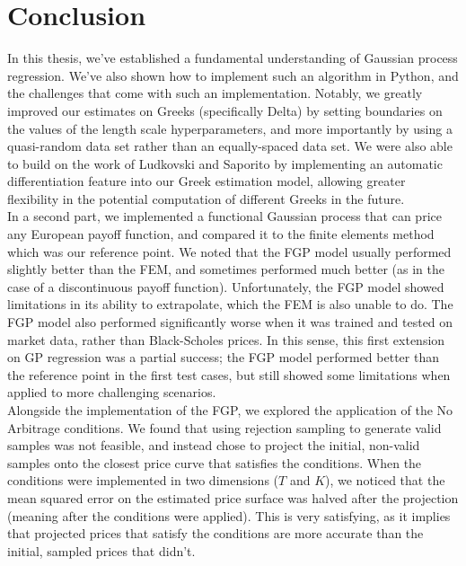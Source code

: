 \documentclass[a4paper,12pt]{article}
\begin{document}
\newpage
\section{Conclusion}
In this thesis, we've established a fundamental understanding of Gaussian process regression. We've also shown how to implement such an algorithm in Python, and the challenges that come with such an implementation. Notably, we greatly improved our estimates on Greeks (specifically Delta) by setting boundaries on the values of the length scale hyperparameters, and more importantly by using a quasi-random data set rather than an equally-spaced data set. We were also able to build on the work of Ludkovski and Saporito \cite{Ludkovski2020} by implementing an automatic differentiation feature into our Greek estimation model, allowing greater flexibility in the potential computation of different Greeks in the future.\\
In a second part, we implemented a functional Gaussian process that can price any European payoff function, and compared it to the finite elements method which was our reference point. We noted that the FGP model usually performed slightly better than the FEM, and sometimes performed much better (as in the case of a discontinuous payoff function). Unfortunately, the FGP model showed limitations in its ability to extrapolate, which the FEM is also unable to do. The FGP model also performed significantly worse when it was trained and tested on market data, rather than Black-Scholes prices.  In this sense, this first extension on GP regression was a partial success; the FGP model performed better than the reference point in the first test cases, but still showed some limitations when applied to more challenging scenarios.\\
Alongside the implementation of the FGP, we explored the application of the No Arbitrage conditions. We found that using rejection sampling to generate valid samples was not feasible, and instead chose to project the initial, non-valid samples onto the closest price curve that satisfies the conditions. When the conditions were implemented in two dimensions ($T$ and $K$), we noticed that the mean squared error on the estimated price surface was halved after the projection (meaning after the conditions were applied). This is very satisfying, as it implies that projected prices that satisfy the conditions are more accurate than the initial, sampled prices that didn't.\\
\end{document}
